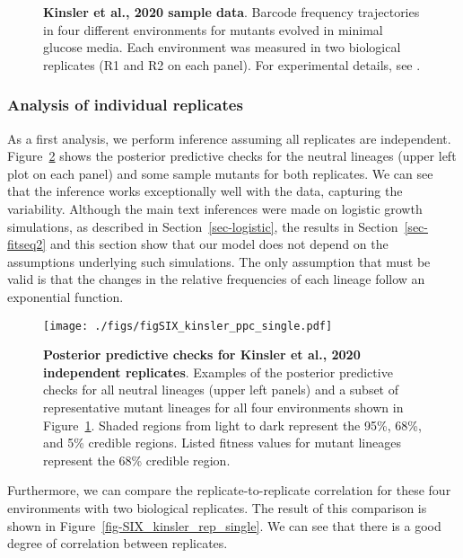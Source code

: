 \documentclass[
]{scrartcl}
\begin{document}
\begin{refsegment}
\begin{figure}
{}

\caption{\label{fig-SIX_kinsler_data}\textbf{Kinsler et al., 2020 sample
data}. Barcode frequency trajectories in four different environments for
mutants evolved in minimal glucose media. Each environment was measured
in two biological replicates (R1 and R2 on each panel). For experimental
details, see \autocite{kinsler2020}.}

\end{figure}

\hypertarget{analysis-of-individual-replicates}{%
\subsubsection{Analysis of individual
replicates}\label{analysis-of-individual-replicates}}

As a first analysis, we perform inference assuming all replicates are
independent. Figure~\ref{fig-SIX_kinsler_ppc_single} shows the posterior
predictive checks for the neutral lineages (upper left plot on each
panel) and some sample mutants for both replicates. We can see that the
inference works exceptionally well with the data, capturing the
variability. Although the main text inferences were made on logistic
growth simulations, as described in Section~\ref{sec-logistic}, the
results in Section~\ref{sec-fitseq2} and this section show that our
model does not depend on the assumptions underlying such simulations.
The only assumption that must be valid is that the changes in the
relative frequencies of each lineage follow an exponential function.

\begin{figure}

{\centering \texttt{[image: ./figs/figSIX\_kinsler\_ppc\_single.pdf]}

}

\caption{\label{fig-SIX_kinsler_ppc_single}\textbf{Posterior predictive
checks for Kinsler et al., 2020 independent replicates}. Examples of the
posterior predictive checks for all neutral lineages (upper left panels)
and a subset of representative mutant lineages for all four environments
shown in Figure~\ref{fig-SIX_kinsler_data}. Shaded regions from light to
dark represent the 95\%, 68\%, and 5\% credible regions. Listed fitness
values for mutant lineages represent the 68\% credible region.}

\end{figure}

Furthermore, we can compare the replicate-to-replicate correlation for
these four environments with two biological replicates. The result of
this comparison is shown in Figure~\ref{fig-SIX_kinsler_rep_single}. We
can see that there is a good degree of correlation between replicates.


\end{refsegment}
\end{document}
